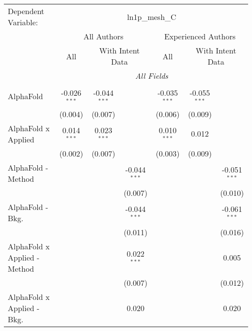 \begingroup
\centering
\begin{tabular}{lcccccc}
   \tabularnewline \midrule \midrule
   Dependent Variable: & \multicolumn{6}{c}{ln1p\_mesh\_C}\\
 & \multicolumn{3}{c}{All Authors} & \multicolumn{3}{c}{Experienced Authors} \\
\cmidrule(lr){2-4} \cmidrule(lr){5-7}
 & \multicolumn{1}{c}{All} & \multicolumn{2}{c}{With Intent Data} & \multicolumn{1}{c}{All} & \multicolumn{2}{c}{With Intent Data} \\
\cmidrule(lr){2-2} \cmidrule(lr){3-4} \cmidrule(lr){5-5} \cmidrule(lr){6-7}
 & \multicolumn{6}{c}{\textit{All Fields}} \\ \\
   AlphaFold                      & -0.026$^{***}$ & -0.044$^{***}$ &                & -0.035$^{***}$ & -0.055$^{***}$ &   \\   
                                  & (0.004)        & (0.007)        &                & (0.006)        & (0.009)        &   \\   
   AlphaFold x Applied            & 0.014$^{***}$  & 0.023$^{***}$  &                & 0.010$^{***}$  & 0.012          &   \\   
                                  & (0.002)        & (0.007)        &                & (0.003)        & (0.009)        &   \\   
   AlphaFold - Method             &                &                & -0.044$^{***}$ &                &                & -0.051$^{***}$\\   
                                  &                &                & (0.007)        &                &                & (0.010)\\   
   AlphaFold - Bkg.               &                &                & -0.044$^{***}$ &                &                & -0.061$^{***}$\\   
                                  &                &                & (0.011)        &                &                & (0.016)\\   
   AlphaFold x Applied - Method   &                &                & 0.022$^{***}$  &                &                & 0.005\\   
                                  &                &                & (0.007)        &                &                & (0.012)\\   
   AlphaFold x Applied - Bkg.     &                &                & 0.020          &                &                & 0.020\\   

\end{tabular}
